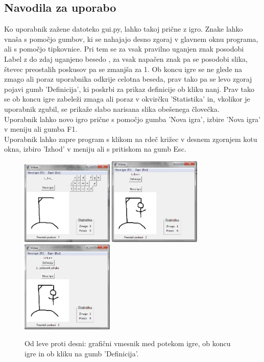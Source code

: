 \documentclass [a4paper, 12pt] {article}
\begin{document}
\subsection {Navodila za uporabo}
Ko uporabnik zažene datoteko gui.py, lahko takoj prične z igro. Znake lahko vnaša s pomočjo gumbov, ki se nahajajo desno zgoraj v glavnem oknu programa, ali s pomočjo tipkovnice. Pri tem se za vsak pravilno uganjen znak posodobi Label z do zdaj uganjeno besedo , za vsak napačen znak pa se posodobi slika, števec preostalih poskusov pa se zmanjša za 1. Ob koncu igre se ne glede na zmago ali poraz uporabnika odkrije celotna beseda, prav tako pa se levo zgoraj pojavi gumb 'Definicija', ki poskrbi za prikaz definicije ob kliku nanj. Prav tako se ob koncu igre zabeleži zmaga ali poraz v okvirčku 'Statistika' in, vkolikor je uporabnik zgubil, se prikaže slabo narisana slika obešenega človečka. \\
Uporabnik lahko novo igro prične s pomočjo gumba 'Nova igra', izbire 'Nova igra' v meniju ali gumba F1. \\
Uporabnik lahko zapre program s klikom na rdeč križec v desnem zgornjem kotu okna, izbiro 'Izhod' v meniju ali s pritiskom na gumb Esc.
\begin {figure} [h]
\centering
\includegraphics [width=125pt] {slike/za_porocilo_gui_progress.png}
\includegraphics [width=125pt] {slike/za_porocilo_gui_zmaga.png}
\includegraphics [width=125pt] {slike/za_porocilo_gui_definicija.png}
\caption {Od leve proti desni: grafični vmesnik med potekom igre, ob koncu igre in ob kliku na gumb 'Definicija'.}
\end {figure}
\end{document}
